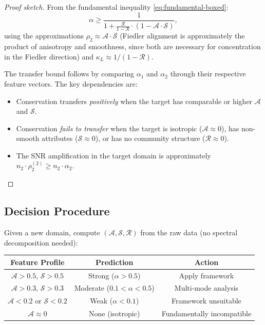 \documentclass[12pt,letterpaper]{article}
\newcommand{\cA}{\mathcal{A}}
\newcommand{\cS}{\mathcal{S}}
\newcommand{\cR}{\mathcal{R}}
\begin{document}
\begin{proof}[Proof sketch]
From the fundamental inequality \eqref{eq:fundamental-boxed}:
\[
  \alpha \geq \frac{1}{1 + \frac{\cR}{1 - \cR} \cdot (1 - \cA \cdot \cS)},
\]
using the approximations $\rho_2 \approx \cA \cdot \cS$ (Fiedler alignment is approximately the product of anisotropy and smoothness, since both are necessary for concentration in the Fiedler direction) and $\kappa_L \approx 1/(1 - \cR)$.

The transfer bound follows by comparing $\alpha_1$ and $\alpha_2$ through their respective feature vectors. The key dependencies are:
\begin{itemize}
  \item Conservation transfers \emph{positively} when the target has comparable or higher $\cA$ and $\cS$.
  \item Conservation \emph{fails to transfer} when the target is isotropic ($\cA \approx 0$), has non-smooth attributes ($\cS \approx 0$), or has no community structure ($\cR \approx 0$).
  \item The SNR amplification in the target domain is approximately $n_2 \cdot \rho_2^{(2)} \geq n_2 \cdot \alpha_2$.
\end{itemize}
\end{proof}

\subsection{Decision Procedure}

Given a new domain, compute $(\cA, \cS, \cR)$ from the raw data (no spectral decomposition needed):

\medskip
\begin{center}
\begin{tabular}{ccc}
  \toprule
  Feature Profile & Prediction & Action \\
  \midrule
  $\cA > 0.5$, $\cS > 0.5$ & Strong ($\alpha > 0.5$) & Apply framework \\
  $\cA > 0.3$, $\cS > 0.3$ & Moderate ($0.1 < \alpha < 0.5$) & Multi-mode analysis \\
  $\cA < 0.2$ or $\cS < 0.2$ & Weak ($\alpha < 0.1$) & Framework unsuitable \\
  $\cA \approx 0$ & None (isotropic) & Fundamentally incompatible \\
  \bottomrule
\end{tabular}
\end{center}

\end{document}
